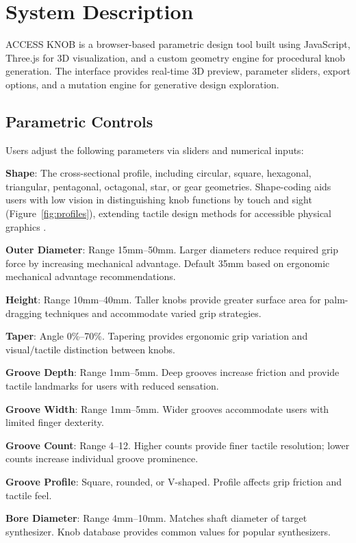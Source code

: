 \documentclass[manuscript,screen,review,anonymous]{acmart}
\begin{document}
\section{System Description}

ACCESS KNOB is a browser-based parametric design tool built using JavaScript, Three.js for 3D visualization, and a custom geometry engine for procedural knob generation. The interface provides real-time 3D preview, parameter sliders, export options, and a mutation engine for generative design exploration.

\subsection{Parametric Controls}
Users adjust the following parameters via sliders and numerical inputs:

\textbf{Shape}: The cross-sectional profile, including circular, square, hexagonal, triangular, pentagonal, octagonal, star, or gear geometries. Shape-coding aids users with low vision in distinguishing knob functions by touch and sight (Figure~\ref{fig:profiles}), extending tactile design methods for accessible physical graphics \cite{manenti2024accessibility}.

\textbf{Outer Diameter}: Range 15mm--50mm. Larger diameters reduce required grip force by increasing mechanical advantage. Default 35mm based on ergonomic mechanical advantage recommendations.

\textbf{Height}: Range 10mm--40mm. Taller knobs provide greater surface area for palm-dragging techniques and accommodate varied grip strategies.

\textbf{Taper}: Angle 0\%--70\%. Tapering provides ergonomic grip variation and visual/tactile distinction between knobs.

\textbf{Groove Depth}: Range 1mm--5mm. Deep grooves increase friction and provide tactile landmarks for users with reduced sensation.

\textbf{Groove Width}: Range 1mm--5mm. Wider grooves accommodate users with limited finger dexterity.

\textbf{Groove Count}: Range 4--12. Higher counts provide finer tactile resolution; lower counts increase individual groove prominence.

\textbf{Groove Profile}: Square, rounded, or V-shaped. Profile affects grip friction and tactile feel.

\textbf{Bore Diameter}: Range 4mm--10mm. Matches shaft diameter of target synthesizer. Knob database provides common values for popular synthesizers.
\end{document}
